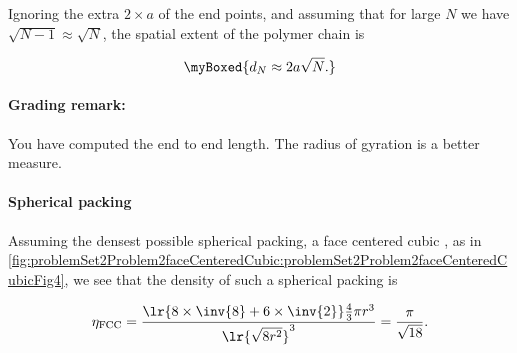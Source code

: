 {Ignoring the extra $2 \times a$ of the end points, and assuming that for large $N$ we have $\sqrt{N-1} \approx \sqrt{N}$, the spatial extent of the polymer chain is

\begin{equation}\label{eqn:basicStatMechProblemSet3Problem2:140}
\myBoxed{
d_N \approx 2 a \sqrt{N}.
}
\end{equation}

\paragraph{Grading remark:} You have computed the end to end length.  The radius of gyration is a better measure.

%

\paragraph{Spherical packing}

Assuming the densest possible spherical packing, a face centered cubic \citep{wiki:spherePacking}, as in \cref{fig:problemSet2Problem2faceCenteredCubic:problemSet2Problem2faceCenteredCubicFig4}, we see that the density of such a spherical packing is


\begin{equation}\label{eqn:basicStatMechProblemSet3Problem2:160}
\eta_{\mathrm{FCC}} =
\frac{\lr{8 \times \inv{8} + 6 \times \inv{2} } \frac{4}{3} \pi r^3}{ \lr{ \sqrt{8 r^2} }^3 }
= 
\frac{\pi}{\sqrt{18}}.
\end{equation}

}
